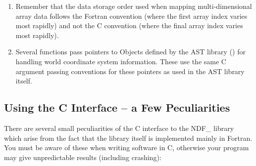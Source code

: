 \documentclass[twoside,11pt,nolof]{starlink}
\begin{document}
\begin{enumerate}
\item Remember that the data storage order used when mapping
multi-dimensional array data follows the Fortran convention (where the
first array index varies most rapidly) and not the C convention (where
the final array index varies most rapidly).

\item Several functions pass pointers to Objects defined by the AST
library () for handling world coordinate
system information. These use the same C argument passing conventions
for these pointers as used in the AST library itself.
\end{enumerate}

\subsection{Using the C Interface -- a Few Peculiarities}

There are several small peculiarities of the C interface to the NDF\_
library which arise from the fact that the library itself is
implemented mainly in Fortran. You must be aware of these when writing
software in C, otherwise your program may give unpredictable results
(including crashing):
\end{document}
